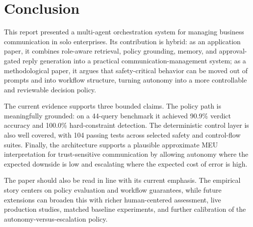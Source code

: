 \documentclass[11pt]{article}
\begin{document}
\section{Conclusion}

This report presented a multi-agent orchestration system for managing business communication in solo enterprises. Its contribution is hybrid: as an application paper, it combines role-aware retrieval, policy grounding, memory, and approval-gated reply generation into a practical communication-management system; as a methodological paper, it argues that safety-critical behavior can be moved out of prompts and into workflow structure, turning autonomy into a more controllable and reviewable decision policy.

The current evidence supports three bounded claims. The policy path is meaningfully grounded: on a 44-query benchmark it achieved 90.9\% verdict accuracy and 100.0\% hard-constraint detection. The deterministic control layer is also well covered, with 104 passing tests across selected safety and control-flow suites. Finally, the architecture supports a plausible approximate MEU interpretation for trust-sensitive communication by allowing autonomy where the expected downside is low and escalating where the expected cost of error is high.

The paper should also be read in line with its current emphasis. The empirical story centers on policy evaluation and workflow guarantees, while future extensions can broaden this with richer human-centered assessment, live production studies, matched baseline experiments, and further calibration of the autonomy-versus-escalation policy.
\clearpage
\end{document}
